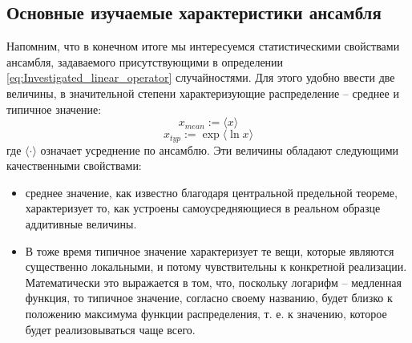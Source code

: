 \subsection{Основные изучаемые характеристики ансамбля}
Напомним, что в конечном итоге мы интересуемся статистическими свойствами ансамбля, задаваемого присутствующими в определении \eqref{eq:Investigated_linear_operator} случайностями. Для этого удобно ввести две величины, в значительной степени характеризующие распределение -- среднее и типичное значение:
$$ x_{mean} := \langle x \rangle $$
$$ x_{typ} := \exp \langle \ln x \rangle $$
где $\langle \cdot \rangle$ означает усреднение по ансамблю. Эти величины обладают следующими качественными свойствами:
\begin{itemize}
	\item среднее значение, как известно благодаря центральной предельной теореме, характеризует то, как устроены самоусредняющиеся в реальном образце аддитивные величины.
	\item В тоже время типичное значение характеризует те вещи, которые являются существенно локальными, и потому чувствительны к конкретной реализации. Математически это выражается в том, что, поскольку логарифм -- медленная функция, то типичное значение, согласно своему названию, будет близко к положению максимума функции распределения, т. е. к значению, которое будет реализовываться чаще всего.
\end{itemize}


